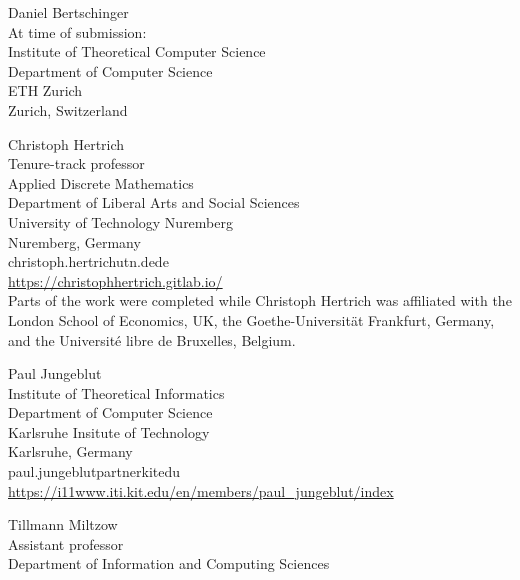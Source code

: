 \documentclass{toc}
\begin{document}
\nocite{conf-version}



%
%
%


%
%
%
%
%
\begin{tocauthors}
\begin{tocinfo}[bertschinger]
 Daniel Bertschinger\\
 At time of submission:\\
 Institute of Theoretical Computer Science\\
 Department of Computer Science\\
 ETH Zurich\\
 Zurich, Switzerland
\end{tocinfo}
\begin{tocinfo}[hertrich]
 Christoph Hertrich\\
 Tenure-track professor\\
 Applied Discrete Mathematics\\
 Department of Liberal Arts and Social Sciences\\
 University of Technology Nuremberg\\
 Nuremberg, Germany\\
 christoph.hertrich\tocat{}utn.de\tocdot{}de \\   %
 \url{https://christophhertrich.gitlab.io/}  \\    %
 Parts of the work were completed while Christoph Hertrich was affiliated with the London School of Economics, UK, the Goethe-Universit{\"a}t Frankfurt, Germany, and the Universit{\'e} libre de Bruxelles, Belgium.
\end{tocinfo}
\begin{tocinfo}[jungeblut]
 Paul Jungeblut\\
 Institute of Theoretical Informatics\\
 Department of Computer Science\\
 Karlsruhe Insitute of Technology\\
 Karlsruhe, Germany\\
 paul.jungeblut\tocat{}partner\tocdot{}kit\tocdot{}edu \\   %
 \url{https://i11www.iti.kit.edu/en/members/paul_jungeblut/index}      %
\end{tocinfo}
\begin{tocinfo}[miltzow]
 Tillmann Miltzow\\
 Assistant professor\\
 Department of Information and Computing Sciences\\

\end{tocinfo}
\end{tocauthors}
\end{document}
